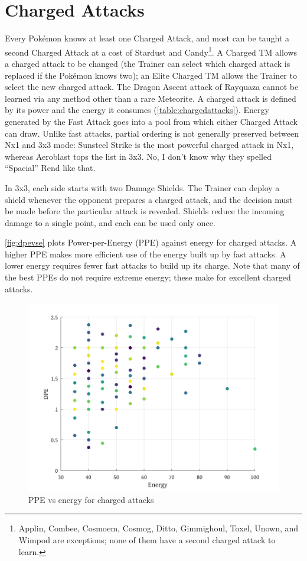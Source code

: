 \section{Charged Attacks\label{sec:charged}}
Every Pokémon knows at least one Charged Attack, and most can be taught a second
  Charged Attack at a cost of Stardust and Candy\footnote{Applin, Combee,
  Cosmoem, Cosmog, Ditto, Gimmighoul, Toxel, Unown, and Wimpod are exceptions;
  none of them have a second charged attack to learn.}.
A Charged TM allows a charged attack to be changed (the Trainer can select
  which charged attack is replaced if the Pokémon knows two);
  an Elite Charged TM allows the Trainer to select the new charged attack.
The Dragon Ascent attack of Rayquaza cannot be learned via any method other
  than a rare Meteorite.
A charged attack is defined by its power and the energy it consumes (\autoref{table:chargedattacks}).
Energy generated by the Fast Attack goes into a pool from which either Charged Attack can draw.
Unlike fast attacks, partial ordering is not generally preserved between Nx1 and 3x3 mode:
  Sunsteel Strike is the most powerful charged attack in Nx1, whereas Aeroblast tops
  the list in 3x3.
No, I don't know why they spelled ``Spacial'' Rend like that.


In 3x3, each side starts with two Damage Shields.
The Trainer can deploy a shield whenever the opponent prepares a charged attack,
   and the decision must be made before the particular attack is revealed.
Shields reduce the incoming damage to a single point, and each can be used only once.

\autoref{fig:dpevse} plots Power-per-Energy (PPE) against energy for charged attacks.
A higher PPE makes more efficient use of the energy built up by fast attacks.
A lower energy requires fewer fast attacks to build up its charge.
Note that many of the best PPEs do not require extreme energy; these make
 for excellent charged attacks.

\begin{figure}[ht]
\includegraphics[keepaspectratio,width=\textwidth]{octave/dpevse.png}
  \caption{PPE vs energy for charged attacks\label{fig:dpevse}}
\end{figure}

